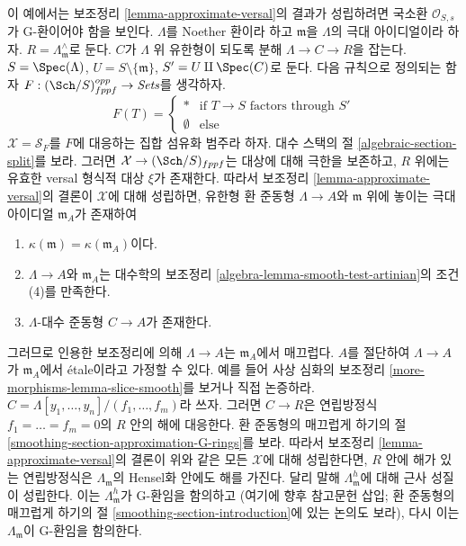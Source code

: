 \begin{example}
\label{example-approximate-versal-implies}
이 예에서는 보조정리 \ref{lemma-approximate-versal}의 결과가 성립하려면
국소환 $\mathcal{O}_{S, s}$가 G-환이어야 함을 보인다.
$\Lambda$를 Noether 환이라 하고 $\mathfrak m$을 $\Lambda$의 극대
아이디얼이라 하자. $R = \Lambda_\mathfrak m^\wedge$로 둔다.
$C$가 $\Lambda$ 위 유한형이 되도록 분해
$\Lambda \to C \to R$을 잡는다.
$S = \Spec(\Lambda)$, $U = S \setminus \{\mathfrak m\}$,
$S' = U \amalg \Spec(C)$로 둔다. 다음 규칙으로 정의되는 함자
$F : (\Sch/S)_{fppf}^{opp} \to \textit{Sets}$를 생각하자.
$$
F(T) = 
\left\{
\begin{matrix}
* & \text{if }T \to S\text{ factors through }S' \\
\emptyset & \text{else}
\end{matrix}
\right.
$$
$\mathcal{X} = \mathcal{S}_F$를 $F$에 대응하는 집합 섬유화 범주라 하자.
대수 스택의 절 \ref{algebraic-section-split}를 보라.
그러면 $\mathcal{X} \to (\Sch/S)_{fppf}$는 대상에 대해 극한을 보존하고,
$R$ 위에는 유효한 versal 형식적 대상 $\xi$가 존재한다.
따라서 보조정리 \ref{lemma-approximate-versal}의 결론이
$\mathcal{X}$에 대해 성립하면, 유한형 환 준동형 $\Lambda \to A$와
$\mathfrak m$ 위에 놓이는 극대 아이디얼 $\mathfrak m_A$가 존재하여
\begin{enumerate}
\item $\kappa(\mathfrak m) = \kappa(\mathfrak m_A)$이다.
\item $\Lambda \to A$와 $\mathfrak m_A$는 대수학의 보조정리
\ref{algebra-lemma-smooth-test-artinian}의 조건 (4)를 만족한다.
\item $\Lambda$-대수 준동형 $C \to A$가 존재한다.
\end{enumerate}
그러므로 인용한 보조정리에 의해 $\Lambda \to A$는
$\mathfrak m_A$에서 매끄럽다. $A$를 절단하여 $\Lambda \to A$가
$\mathfrak m_A$에서 \'etale이라고 가정할 수 있다. 예를 들어
사상 심화의 보조정리 \ref{more-morphisms-lemma-slice-smooth}를 보거나
직접 논증하라.
$C = \Lambda[y_1, \ldots, y_n]/(f_1, \ldots, f_m)$라 쓰자.
그러면 $C \to R$은 연립방정식 $f_1 = \ldots = f_m = 0$의 $R$ 안의
해에 대응한다. 환 준동형의 매끄럽게 하기의
절 \ref{smoothing-section-approximation-G-rings}를 보라.
따라서 보조정리 \ref{lemma-approximate-versal}의 결론이 위와 같은
모든 $\mathcal{X}$에 대해 성립한다면, $R$ 안에 해가 있는 연립방정식은
$\Lambda_{\mathfrak m}$의 Hensel화 안에도 해를 가진다.
달리 말해 $\Lambda_{\mathfrak m}^h$에 대해 근사 성질이 성립한다.
이는 $\Lambda_{\mathfrak m}^h$가 G-환임을 함의하고
(여기에 향후 참고문헌 삽입; 환 준동형의 매끄럽게 하기의
절 \ref{smoothing-section-introduction}에 있는 논의도 보라),
다시 이는 $\Lambda_{\mathfrak m}$이 G-환임을 함의한다.
\end{example}






